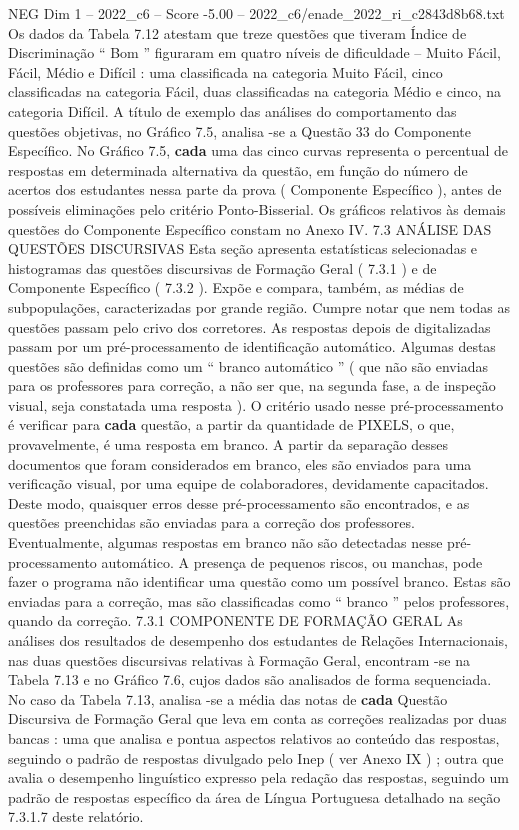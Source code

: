 \begin{textsample}{NEG Dim 1 – 2022\_c6 – Score -5.00 – 2022\_c6/enade\_2022\_ri\_c2843d8b68.txt}
Os dados da Tabela 7.12 atestam que treze questões que tiveram Índice de Discriminação “ Bom ” figuraram em quatro níveis de dificuldade – Muito Fácil, Fácil, Médio e Difícil : uma classificada na categoria Muito Fácil, cinco classificadas na categoria Fácil, duas classificadas na categoria Médio e cinco, na categoria Difícil.
A título de exemplo das análises do comportamento das questões objetivas, no Gráfico 7.5, analisa -se a Questão 33 do Componente Específico.
No Gráfico 7.5, \textbf{cada} uma das cinco curvas representa o percentual de respostas em determinada alternativa da questão, em função do número de acertos dos estudantes nessa parte da prova ( Componente Específico ), antes de possíveis eliminações pelo critério Ponto-Bisserial.
Os gráficos relativos às demais questões do Componente Específico constam no Anexo IV. 7.3 ANÁLISE DAS QUESTÕES DISCURSIVAS Esta seção apresenta estatísticas selecionadas e histogramas das questões discursivas de Formação Geral ( 7.3.1 ) e de Componente Específico ( 7.3.2 ).
Expõe e compara, também, as médias de subpopulações, caracterizadas por grande região.
Cumpre notar que nem todas as questões passam pelo crivo dos corretores.
As respostas depois de digitalizadas passam por um pré-processamento de identificação automático.
Algumas destas questões são definidas como um “ branco automático ” ( que não são enviadas para os professores para correção, a não ser que, na segunda fase, a de inspeção visual, seja constatada uma resposta ).
O critério usado nesse pré-processamento é verificar para \textbf{cada} questão, a partir da quantidade de PIXELS, o que, provavelmente, é uma resposta em branco.
A partir da separação desses documentos que foram considerados em branco, eles são enviados para uma verificação visual, por uma equipe de colaboradores, devidamente capacitados.
Deste modo, quaisquer erros desse pré-processamento são encontrados, e as questões preenchidas são enviadas para a correção dos professores.
Eventualmente, algumas respostas em branco não são detectadas nesse pré-processamento automático.
A presença de pequenos riscos, ou manchas, pode fazer o programa não identificar uma questão como um possível branco.
Estas são enviadas para a correção, mas são classificadas como “ branco ” pelos professores, quando da correção. 7.3.1 COMPONENTE DE FORMAÇÃO GERAL As análises dos resultados de desempenho dos estudantes de Relações Internacionais, nas duas questões discursivas relativas à Formação Geral, encontram -se na Tabela 7.13 e no Gráfico 7.6, cujos dados são analisados de forma sequenciada.
No caso da Tabela 7.13, analisa -se a média das notas de \textbf{cada} Questão Discursiva de Formação Geral que leva em conta as correções realizadas por duas bancas : uma que analisa e pontua aspectos relativos ao conteúdo das respostas, seguindo o padrão de respostas divulgado pelo Inep ( ver Anexo IX ) ; outra que avalia o desempenho linguístico expresso pela redação das respostas, seguindo um padrão de respostas específico da área de Língua Portuguesa detalhado na seção 7.3.1.7 deste relatório.

\end{textsample}
